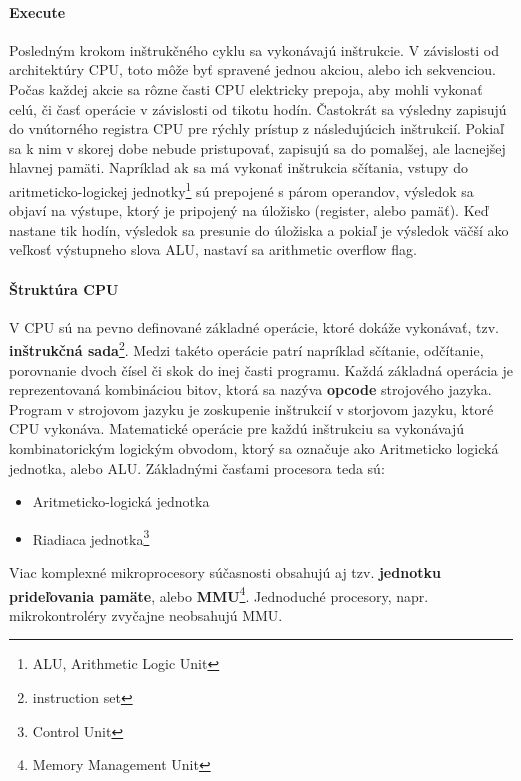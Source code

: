 \documentclass[11pt,a4paper]{report}
\begin{document}
\paragraph{Execute} Posledným krokom inštrukčného cyklu sa vykonávajú inštrukcie. V závislosti od architektúry CPU, toto môže byť spravené jednou akciou, alebo ich sekvenciou. Počas každej akcie sa rôzne časti CPU elektricky prepoja, aby mohli vykonať celú, či časť operácie v závislosti od tikotu hodín. Častokrát sa výsledny zapisujú do vnútorného registra CPU pre rýchly prístup z následujúcich inštrukcií. Pokiaľ sa k nim v skorej dobe nebude pristupovať, zapisujú sa do pomalšej, ale lacnejšej hlavnej pamäti. Napríklad ak sa má vykonať inštrukcia sčítania, vstupy do aritmeticko-logickej jednotky\footnote{ALU, Arithmetic Logic Unit} sú prepojené s párom operandov, výsledok sa objaví na výstupe, ktorý je pripojený na úložisko (register, alebo pamäť). Keď nastane tik hodín, výsledok sa presunie do úložiska a pokiaľ je výsledok väčší ako veľkosť výstupneho slova ALU, nastaví sa arithmetic overflow flag.

\paragraph{Štruktúra CPU} V CPU sú na pevno definované základné operácie, ktoré dokáže vykonávať, tzv. \textbf{inštrukčná sada}\footnote{instruction set}. Medzi takéto operácie patrí napríklad sčítanie, odčítanie, porovnanie dvoch čísel či skok do inej časti programu. Každá základná operácia je reprezentovaná kombináciou bitov, ktorá sa nazýva \textbf{opcode} strojového jazyka. Program v strojovom jazyku je zoskupenie inštrukcií v storjovom jazyku, ktoré CPU vykonáva. Matematické operácie pre každú inštrukciu sa vykonávajú kombinatorickým logickým obvodom, ktorý sa označuje ako Aritmeticko logická jednotka, alebo ALU. Základnými časťami procesora teda sú: 
\begin{itemize}
\item Aritmeticko-logická jednotka
\item Riadiaca jednotka\footnote{Control Unit}
\end{itemize}
Viac komplexné mikroprocesory súčasnosti obsahujú aj tzv. \textbf{jednotku prideľovania pamäte}, alebo \textbf{MMU}\footnote{Memory Management Unit}. Jednoduché procesory, napr. mikrokontroléry zvyčajne neobsahujú MMU.
\end{document}

